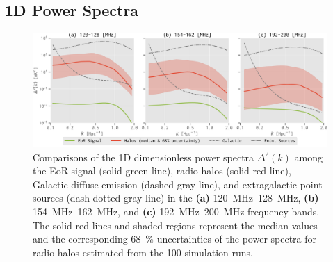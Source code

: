\documentclass[twocolumn]{aastex62}
\begin{document}
\subsection{1D Power Spectra}
\label{sec:ps1d}

\begin{figure}
  \centering
  \includegraphics[width=\textwidth]{ps1d-3bands}
  \caption{\label{fig:ps1d-3bands}%
    Comparisons of the 1D dimensionless power spectra $\Delta^2(k)$
    among the EoR signal (solid green line), radio halos (solid red line),
    Galactic diffuse emission (dashed gray line), and extragalactic point
    sources (dash-dotted gray line) in the
    \textbf{(a)} \SIrange{120}{128}{\MHz},
    \textbf{(b)} \SIrange{154}{162}{\MHz}, and
    \textbf{(c)} \SIrange{192}{200}{\MHz} frequency bands.
    The solid red lines and shaded regions represent the median values
    and the corresponding \SI{68}{\percent} uncertainties of the power
    spectra for radio halos estimated from the 100 simulation runs.
  }
\end{figure}
\end{document}
